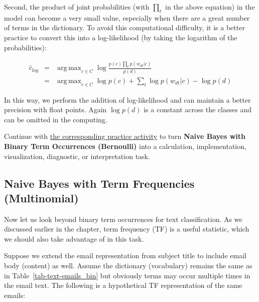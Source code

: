 \documentclass[
  letterpaper,
]{scrbook}
\begin{document}
Second, the product of joint probabilities (with \(\prod_t\) in the
above equation) in the model can become a very small value, especially
when there are a great number of terms in the dictionary. To avoid this
computational difficulty, it is a better practice to convert this into a
log-likelihood (by taking the logarithm of the probabilities):

\[\begin{aligned}
  \hat{c}_{log}
  & = & \mathop{\mathrm{arg\,max}}_{c \in C} \log \frac{p(c)\prod_{t} p(w_{dt}|c)}{p(d)} \\
  & = & \mathop{\mathrm{arg\,max}}_{c \in C} \log p(c) + \sum_{t} \log p(w_{dt}|c) - \log p(d)
\end{aligned}\]

In this way, we perform the addition of log-likelihood and can maintain
a better precision with float points. Again \(\log p(d)\) is a constant
across the classes and can be omitted in the computing.

\begin{tcolorbox}[enhanced jigsaw, arc=.35mm, bottomrule=.15mm, bottomtitle=1mm, breakable, colback=white, colbacktitle=quarto-callout-tip-color!10!white, colframe=quarto-callout-tip-color-frame, coltitle=black, left=2mm, leftrule=.75mm, opacityback=0, opacitybacktitle=0.6, rightrule=.15mm, title=\textcolor{quarto-callout-tip-color}{\faLightbulb}\hspace{0.5em}{Put it into practice}, titlerule=0mm, toprule=.15mm, toptitle=1mm]

Continue with
\hyperref[sec-pr-11-naive-bayes-with-binary-term-occurrences-bernoulli]{the
corresponding practice activity} to turn \textbf{Naive Bayes with Binary
Term Occurrences (Bernoulli)} into a calculation, implementation,
visualization, diagnostic, or interpretation task.

\end{tcolorbox}

\subsection{Naive Bayes with Term Frequencies
(Multinomial)}\label{naive-bayes-with-term-frequencies-multinomial}

Now let us look beyond binary term occurrences for text classification.
As we discussed earlier in the chapter, term frequency (TF) is a useful
statistic, which we should also take advantage of in this task.

Suppose we extend the email representation from subject title to include
email body (content) as well. Assume the dictionary (vocabulary) remains
the same as in
Table~\hyperref[tab-text-emails_bin]{{[}tab-text-emails\_bin{]}} but
obviously terms may occur multiple times in the email text. The
following is a hypothetical TF representation of the same emails:
\end{document}
